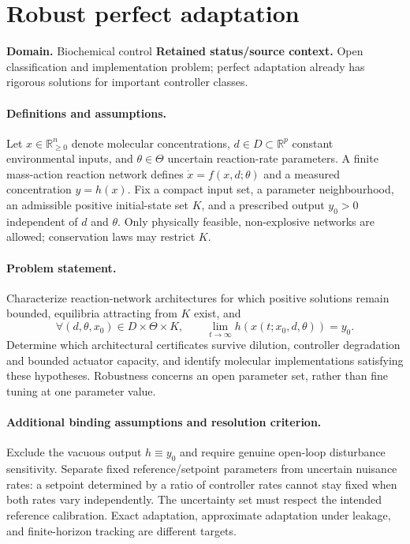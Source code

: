 \documentclass[11pt]{article}
\begin{document}
\section*{Robust perfect adaptation}
\label{prob:051}
\label{rank:320}
\par\smallskip

\noindent\textbf{Domain.} Biochemical control \quad \textbf{Retained status/source context.} Open classification and implementation problem; perfect adaptation already has rigorous solutions for important controller classes.
\paragraph{Definitions and assumptions.} Let $x\in\mathbb{R}_{\ge0}^n$ denote molecular concentrations, $d\in D\subset\mathbb{R}^p$ constant environmental inputs, and $\theta\in\Theta$ uncertain reaction-rate parameters. A finite mass-action reaction network defines $\dot x=f(x,d;\theta)$ and a measured concentration $y=h(x)$. Fix a compact input set, a parameter neighbourhood, an admissible positive initial-state set $K$, and a prescribed output $y_0>0$ independent of $d$ and $\theta$. Only physically feasible, non-explosive networks are allowed; conservation laws may restrict $K$.
\paragraph{Problem statement.} Characterize reaction-network architectures for which positive solutions remain bounded, equilibria attracting from $K$ exist, and
\[\forall(d,\theta,x_0)\in D\times\Theta\times K,\qquad \lim_{t\to\infty}h(x(t;x_0,d,\theta))=y_0.\]
Determine which architectural certificates survive dilution, controller degradation and bounded actuator capacity, and identify molecular implementations satisfying these hypotheses. Robustness concerns an open parameter set, rather than fine tuning at one parameter value.
\paragraph{Additional binding assumptions and resolution criterion.} Exclude the vacuous output $h\equiv y_0$ and require genuine open-loop disturbance sensitivity. Separate fixed reference/setpoint parameters from uncertain nuisance rates: a setpoint determined by a ratio of controller rates cannot stay fixed when both rates vary independently. The uncertainty set must respect the intended reference calibration. Exact adaptation, approximate adaptation under leakage, and finite-horizon tracking are different targets.
\end{document}
